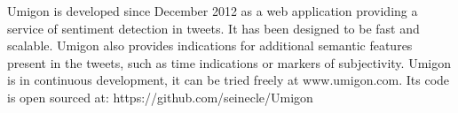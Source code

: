 Umigon is developed since December 2012 as a web application providing a service of sentiment detection in tweets. It has been designed to be fast and
 scalable. Umigon also provides indications for additional semantic features
 present in the tweets, such as time indications or markers of subjectivity.
 Umigon is in continuous development, it can be tried freely at www.umigon.com.
 Its code is open sourced at: https://github.com/seinecle/Umigon

